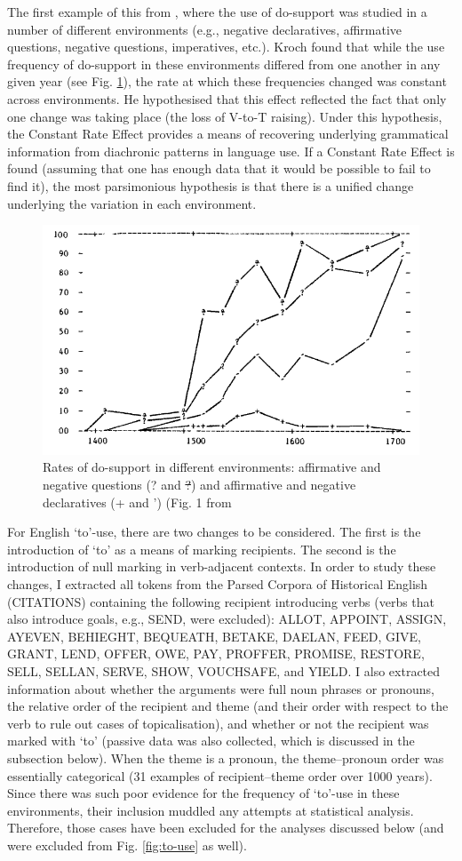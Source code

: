 	The first example of this from \cite{Kroch.1989}, where the use of do-support was studied in a number of different environments (e.g., negative declaratives, affirmative questions, negative questions, imperatives, etc.). Kroch found that while the use frequency of do-support in these environments differed from one another in any given year (see Fig. \ref{fig:kroch-graph}), the rate at which these frequencies changed was constant across environments. He hypothesised that this effect reflected the fact that only one change was taking place (the loss of V-to-T raising). Under this hypothesis, the Constant Rate Effect provides a means of recovering underlying grammatical information from diachronic patterns in language use. If a Constant Rate Effect is found (assuming that one has enough data that it would be possible to fail to find it), the most parsimonious hypothesis is that there is a unified change underlying the variation in each environment.

	\begin{figure}[ht!]
		\includegraphics[width=.5\linewidth]{../images/kroch-graph}
		\caption{Rates of do-support in different environments: affirmative and negative questions (? and \sout{?}) and affirmative and negative declaratives (+ and ') (Fig. 1 from \citealt{Kroch.1989}}
		\label{fig:kroch-graph}
	\end{figure}

	For English `to'-use, there are two changes to be considered. The first is the introduction of `to' as a means of marking recipients. The second is the introduction of null marking in verb-adjacent contexts. In order to study these changes, I extracted all tokens from the Parsed Corpora of Historical English (CITATIONS) containing the following recipient introducing verbs (verbs that also introduce goals, e.g., SEND, were excluded): ALLOT, APPOINT, ASSIGN, AYEVEN, BEHIEGHT, BEQUEATH, BETAKE, DAELAN, FEED, GIVE, GRANT, LEND, OFFER, OWE, PAY, PROFFER, PROMISE, RESTORE, SELL, SELLAN, SERVE, SHOW, VOUCHSAFE, and YIELD. I also extracted information about whether the arguments were full noun phrases or pronouns, the relative order of the recipient and theme (and their order with respect to the verb to rule out cases of topicalisation), and whether or not the recipient was marked with `to' (passive data was also collected, which is discussed in the subsection below). When the theme is a pronoun, the theme--pronoun order was essentially categorical (31 examples of recipient--theme order over 1000 years). Since there was such poor evidence for the frequency of `to'-use in these environments, their inclusion muddled any attempts at statistical analysis. Therefore, those cases have been excluded for the analyses discussed below (and were excluded from Fig. \ref{fig:to-use} as well).

